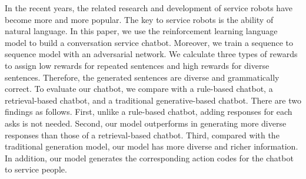 In the recent years, the related research and development of service robots have become more and more popular. The key to service robots is the ability of natural language. In this paper, we use the reinforcement learning language model to build a conversation service chatbot. Moreover, we train a sequence to sequence model with an adversarial network. We calculate three types of rewards to assign low rewards for repeated sentences and high rewards for diverse sentences. Therefore, the generated sentences are diverse and grammatically correct. To evaluate our chatbot, we compare with a rule-based chatbot, a retrieval-based chatbot, and a traditional generative-based chatbot. There are two findings as follows. First, unlike a rule-based chatbot, adding responses for each asks is not needed. Second, our model outperforms in generating more diverse responses than those of a retrieval-based chatbot. Third, compared with the traditional generation model, our model has more diverse and richer information. In addition, our model generates the corresponding action codes for the chatbot to service people. 
